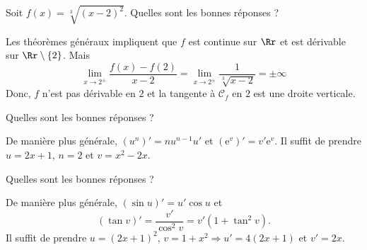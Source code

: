 \begin{question}

Soit $\displaystyle f(x)=\sqrt[3]{(x-2)^2}$. Quelles sont les bonnes réponses ?
\begin{answers}  
\end{answers}
\begin{explanations}
Les théorèmes généraux impliquent que $f$ est continue sur $\Rr$ et est dérivable sur $\Rr\setminus\{2\}$. Mais
$$\lim_{x\to 2^{\pm}}\frac{f(x)-f(2)}{x-2}=\lim_{x\to 2^{\pm}}\frac{1}{\sqrt[3]{x-2}}={\pm}\infty $$
Donc, $f$ n'est pas dérivable en $2$ et la tangente à $\mathcal{C}_f$ en $2$ est une droite verticale.
\end{explanations}
\end{question}




\begin{question}

Quelles sont les bonnes réponses ?
\begin{answers}  
\end{answers}
\begin{explanations}
De manière plus générale, $(u^n)'=nu^{n-1}u'$ et $(\mathrm{e}^v)'=v'\mathrm{e}^v$. Il suffit de prendre $u=2x+1$, $n=2$ et $v=x^2-2x$.
\end{explanations}
\end{question}


\begin{question}

Quelles sont les bonnes réponses ?
\begin{answers}  
\end{answers}
\begin{explanations}
De manière plus générale, $(\sin u)'=u'\cos u$ et 
$$(\tan v)'=\frac{v'}{\cos ^2v}=v'(1+\tan ^2v).$$
Il suffit de prendre $u=(2x+1)^2$, $v=1+x^2\Rightarrow u'=4(2x+1)$ et $v'=2x$.
\end{explanations}
\end{question}





